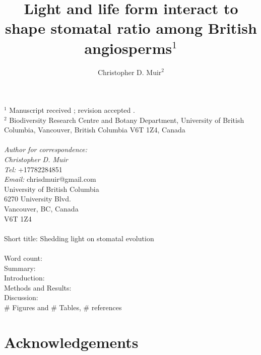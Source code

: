 \documentclass[12pt, oneside]{article}
\begin{document}


\title{Light and life form interact to shape stomatal ratio among British angiosperms$^1$}
\author{Christopher D. Muir$^2$}
\date{} %

\maketitle

$^1$ Manuscript received \underline{     }; revision accepted \underline{     }. \\

$^2$ Biodiversity Research Centre and Botany Department, University of British Columbia, Vancouver, British Columbia V6T 1Z4, Canada \\
\\
\textit{Author for correspondence:} \\
\textit{Christopher D. Muir} \\
\textit{Tel:} +17782284851 \\
\textit{Email:} chrisdmuir@gmail.com \\
University of British Columbia \\
6270 University Blvd. \\
Vancouver, BC, Canada \\
V6T 1Z4 \\
\\
Short title: Shedding light on stomatal evolution\\
\\
Word count: \\
Summary:  \\
Introduction:  \\
Methods and Results:  \\
Discussion:  \\
\# Figures and \# Tables, \# references



\section*{Acknowledgements}

\end{document}
